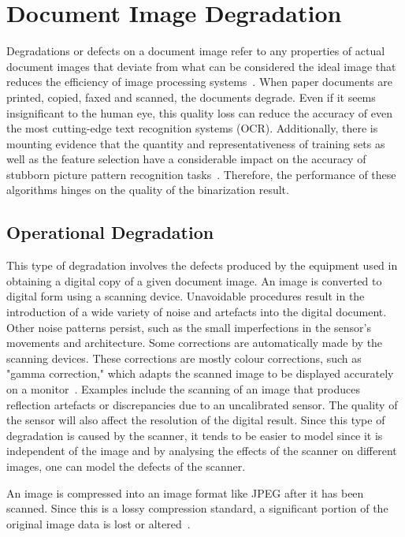 \documentclass[a4paper, 12pt]{report}
\begin{document}
\section{Document Image Degradation}
Degradations or defects on a document image refer to any properties of actual
document images that deviate from what can be considered the ideal image that
reduces the efficiency of image processing systems~\cite{Baird2007}. When paper
documents are printed, copied, faxed and scanned, the documents degrade. Even
if it seems insignificant to the human eye, this quality loss can reduce the
accuracy of even the most cutting-edge text recognition systems (OCR).
Additionally, there is mounting evidence that the quantity and
representativeness of training sets as well as the feature selection have a
considerable impact on the accuracy of stubborn picture pattern recognition
tasks~\cite{Baird2007}. Therefore, the performance of these algorithms hinges
on the quality of the binarization result. \par

\subsection{Operational Degradation}
This type of degradation involves the defects produced by the equipment used in
obtaining a digital copy of a given document image. An image is converted to
digital form using a scanning device. Unavoidable procedures result in the
introduction of a wide variety of noise and artefacts into the digital
document. Other noise patterns persist, such as the small imperfections in the
sensor's movements and architecture. Some corrections are automatically made by
the scanning devices. These corrections are mostly colour corrections, such as
"gamma correction," which adapts the scanned image to be displayed accurately
on a monitor~\cite{smoaca2011id}. Examples include the scanning of an image
that produces reflection artefacts or discrepancies due to an uncalibrated
sensor. The quality of the sensor will also affect the resolution of the
digital result. Since this type of degradation is caused by the scanner, it
tends to be easier to model since it is independent of the image and by
analysing the effects of the scanner on different images, one can model the
defects of the scanner.\par

An image is compressed into an image format like JPEG after it has been
scanned. Since this is a lossy compression standard, a significant portion of
the original image data is lost or altered~\cite{eskenazi2016stability}. \par
\end{document}
